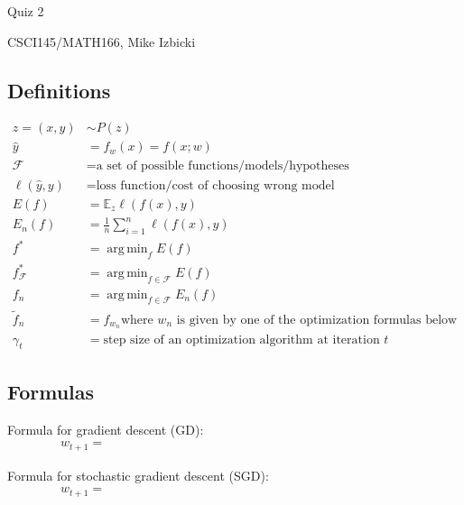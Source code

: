 \documentclass[10pt,fleqn]{article}
\theoremstyle{definition}
\DeclareMathOperator*{\argmin}{arg\,min}
\begin{document}
\begin{center}
    {
\Large
Quiz 2
}

    \vspace{0.1in}
CSCI145/MATH166, Mike Izbicki

    \vspace{0.1in}
\end{center}

\renewcommand{\arraystretch}{3}
\addtolength{\jot}{1em}

\subsection*{Definitions}
\begin{align*}
    z = (x,y) & \sim P(z) \\
    \hat y &= f_w (x) = f(x;w) \\
    \mathcal F &= \text{a set of possible functions/models/hypotheses} \\
    \ell(\hat y, y) &= \text{loss function/cost of choosing wrong model} \\
    E(f) &= \mathbb E_z \ell(f(x),y) \\
    E_n(f) &= \frac1n \sum_{i=1}^n \ell(f(x),y) \\
    f^* &= \argmin_f E(f) \\
    f^*_{\mathcal F} &= \argmin_{f\in\mathcal F} E(f) \\
    f_n &= \argmin_{f\in\mathcal F} E_n(f) \\
    \tilde f_n &= f_{w_n} \text{where $w_n$ is given by one of the optimization formulas below} \\
    \gamma_t &= \text{step size of an optimization algorithm at iteration $t$} 
\end{align*}

\subsection*{Formulas}

Formula for gradient descent (GD):
\vspace{0.2in}
\begin{align*}
    w_{t+1} = \hspace{4in}
\end{align*}
\vspace{0.2in}

\noindent
Formula for stochastic gradient descent (SGD):
\vspace{0.2in}
\begin{align*}
    w_{t+1} = \hspace{4in}
\end{align*}
\vspace{0.2in}
\end{document}
